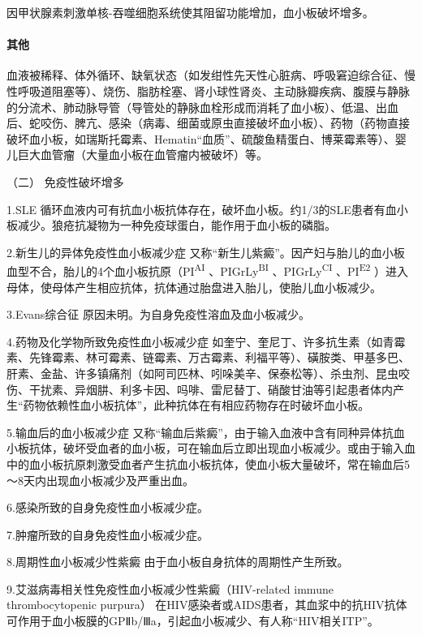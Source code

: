 因甲状腺素刺激单核-吞噬细胞系统使其阻留功能增加，血小板破坏增多。

\paragraph{其他}

血液被稀释、体外循环、缺氧状态（如发绀性先天性心脏病、呼吸窘迫综合征、慢性呼吸道阻塞等）、烧伤、脂肪栓塞、肾小球性肾炎、主动脉瓣疾病、腹膜与静脉的分流术、肺动脉导管（导管处的静脉血栓形成而消耗了血小板）、低温、出血后、蛇咬伤、脾亢、感染（病毒、细菌或原虫直接破坏血小板）、药物（药物直接破坏血小板，如瑞斯托霉素、Hematin“血质”、硫酸鱼精蛋白、博莱霉素等）、婴儿巨大血管瘤（大量血小板在血管瘤内被破坏）等。

\hypertarget{text00332.htmlux5cux23CHP12-1-2-1-2-2}{}
（二） 免疫性破坏增多

1.SLE
循环血液内可有抗血小板抗体存在，破坏血小板。约1/3的SLE患者有血小板减少。狼疮抗凝物为一种免疫球蛋白，能作用于血小板的磷脂。

2.新生儿的异体免疫性血小板减少症
又称“新生儿紫癜”。因产妇与胎儿的血小板血型不合，胎儿的4个血小板抗原（PI\textsuperscript{AI}
、PIGrLy\textsuperscript{BI} 、PIGrLy\textsuperscript{CI}
、PI\textsuperscript{E2}
）进入母体，使母体产生相应抗体，抗体通过胎盘进入胎儿，使胎儿血小板减少。

3.Evans综合征 原因未明。为自身免疫性溶血及血小板减少。

4.药物及化学物所致免疫性血小板减少症
如奎宁、奎尼丁、许多抗生素（如青霉素、先锋霉素、林可霉素、链霉素、万古霉素、利福平等）、磺胺类、甲基多巴、肝素、金盐、许多镇痛剂（如阿司匹林、吲哚美辛、保泰松等）、杀虫剂、昆虫咬伤、干扰素、异烟肼、利多卡因、吗啡、雷尼替丁、硝酸甘油等引起患者体内产生“药物依赖性血小板抗体”，此种抗体在有相应药物存在时破坏血小板。

5.输血后的血小板减少症
又称“输血后紫癜”，由于输入血液中含有同种异体抗血小板抗体，破坏受血者的血小板，可在输血后立即出现血小板减少。或由于输入血中的血小板抗原刺激受血者产生抗血小板抗体，使血小板大量破坏，常在输血后5～8天内出现血小板减少及严重出血。

6.感染所致的自身免疫性血小板减少症。

7.肿瘤所致的自身免疫性血小板减少症。

8.周期性血小板减少性紫癜 由于血小板自身抗体的周期性产生所致。

9.艾滋病毒相关性免疫性血小板减少性紫癜（HIV-related immune
thrombocytopenic purpura）
在HIV感染者或AIDS患者，其血浆中的抗HIV抗体可作用于血小板膜的GPⅡb/Ⅲa，引起血小板减少、有人称“HIV相关ITP”。

